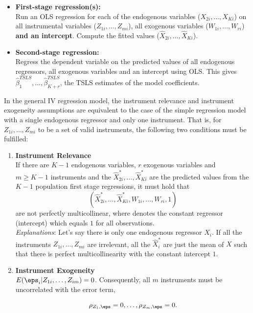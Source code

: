\documentclass[
  letterpaper,
  DIV=11,
  numbers=noendperiod]{scrreprt}
\theoremstyle{definition}
\theoremstyle{plain}
\theoremstyle{plain}
\theoremstyle{remark}
\begin{document}
{\begin{itemize}
\item \textbf{First-stage regression(s):}\\
Run an OLS regression for each of the endogenous variables ($X_{2i},\dots,X_{Ki}$) on all instrumental variables ($Z_{1i},\dots,Z_{mi}$), all exogenous variables ($W_{1i},\dots,W_{ri}$) \textbf{and an intercept}. Compute the fitted values ($\widehat{X}_{2i},\dots,\widehat{X}_{Ki}$).
\item \textbf{Second-stage regression:}\\
Regress the dependent variable on the predicted values of all endogenous regressors, all exogenous variables and an intercept using OLS. This gives $\widehat{\beta}_{1}^{TSLS},\dots,\widehat{\beta}_{K+r}^{TSLS}$, the TSLS estimates of the model coefficients.
\end{itemize}

In the general IV regression model, the instrument relevance and
instrument exogeneity assumptions are equivalent to the case of the
simple regression model with a single endogenous regressor and only one
instrument. That is, for \(Z_{1i},\dots,Z_{mi}\) to be a set of valid
instruments, the following two conditions must be fulfilled:

\begin{enumerate}
\item \textbf{Instrument Relevance}\\
If there are $K-1$ endogenous variables, $r$ exogenous variables and $m\geq K-1$ instruments and the $\widehat{X}_{2i}^*,\dots,\widehat{X}_{Ki}^*$ are the predicted values from the $K-1$ population first stage regressions, it must hold that $$(\widehat{X}_{2i}^*,\dots,\widehat{X}_{Ki}^*, W_{1i}, \dots, W_{ri},1)$$ are not perfectly multicollinear, where  denotes the constant regressor (intercept) which equals $1$ for all observations.\\
\textit{Explanations}:  Let's say there is only one endogenous regressor $X_i$. If all the instruments $Z_{1i},\dots,Z_{mi}$ are irrelevant, all the $\widehat{X}^*_i$ are just the mean of $X$ such that there is perfect multicollinearity with the constant intercept $1$.\\
\item \textbf{Instrument Exogeneity}\\
$E(\eps_i|Z_{1i},\dots,Z_{im})=0$. Consequently, all $m$ instruments must be uncorrelated with the error term, 


$$
\rho_{Z_{1},\eps} = 0,\dots,\rho_{Z_{m},\eps} = 0.
$$



\end{enumerate}}
\end{document}
